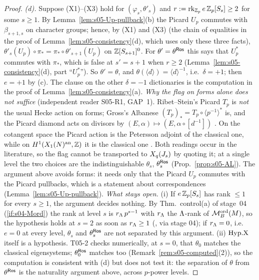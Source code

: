 \begin{proof}
\emph{(d).} Suppose (X1)--(X3) hold for $(\varphi_s,\theta'_s)$ and $r:=\operatorname{rk}_{\mathbb{Z}_p}e\,\mathbb{Z}_p[S_s]\ge2$ for some $s\ge1$. By
Lemma~\ref{lem:s05-Up-pullback}(b) the Picard $U_p$ commutes with $\beta_{s+1,s}$ on character groups; hence, by (X1) and (X3) (the chain of
equalities in the proof of Lemma~\ref{lem:s05-consistency}(d), which uses only these three facts), $\theta'_s(U_p)\circ\pi_*=\pi_*\circ\theta'_{s+1}(U_p)$
on $\mathbb{Z}[S_{s+1}]^0$. For $\theta'=\theta^{\mathsf{Ros}}$ this says that $U_p^*$ commutes with $\pi_*$, which is false at $s'=s+1$ when $r\ge2$
(Lemma~\ref{lem:s05-consistency}(d), part ``$U_p^*$''). So $\theta'=\theta$, and $\theta(\langle d\rangle)=\langle d\rangle^{-1}$, i.e.\ $\delta=+1$; then $e=+1$ by (c).
The clause on the other $\delta=-1$ dictionaries is the computation in the proof of Lemma~\ref{lem:s05-consistency}(a).
\emph{Why the flag on forms alone does not suffice} (independent reader S05-R1, GAP~1). Ribet--Stein's Picard $T_p$ is \emph{not} the usual
Hecke action on forms; Gross's Albanese $(T_p)_*=T_p\circ\langle p^{-1}\rangle^*$ is, and the Picard diamond acts on divisors by
$(E,\alpha)\mapsto(E,\alpha\circ[d^{-1}])$ . On the cotangent
space the Picard action is the Petersson adjoint of the classical one, while on $H^1(X_1(N)^{\rm an},\mathbb{Z})$ it is the classical one
. Both readings occur in the literature, so the flag cannot be
transported to $X_q(J_s)$ by quoting it; at a single level the two choices are the indistinguishable $\theta_s$, $\theta^{\mathsf{Ros}}_s$
(Prop.~\ref{prop:s05-AL}). The argument above avoids forms: it needs only that the Picard $U_p$ commutes with the Picard pullbacks, which
is a statement about correspondences (Lemma~\ref{lem:s05-Up-pullback}).
\emph{What stays open.} (i) If $e\,\mathbb{Z}_p[S_s]$ has rank $\le1$ for every $s\ge1$, the argument decides nothing. By Thm.~control(a) of stage~04
(\ref{if:s04-Mord}) the rank at level $s$ is $r_\Lambda\,p^{s-1}$ with $r_\Lambda$ the $\Lambda$-rank of $\mathcal{M}^{\mathrm{ord}}_B(M)$, so the hypothesis holds at $s=2$ as soon
as $r_\Lambda\ge1$ (\stpmc, via stage 04); if $r_\Lambda=0$, i.e.\ $e=0$ at every level, $\theta_s$ and $\theta^{\mathsf{Ros}}_s$ are not separated by this
argument. (ii) $\mathrm{Hyp.X}$ itself is a hypothesis. T05-2 checks numerically, at $s=0$, that $\theta_0$ matches the classical eigensystems; $\theta^{\mathsf{Ros}}_0$ matches too
(Remark~\ref{rem:s05-computed}(2)), so the computation is consistent with (d) but does not test it: the separation of $\theta$ from $\theta^{\mathsf{Ros}}$
is the naturality argument above, across $p$-power levels.
\end{proof}

